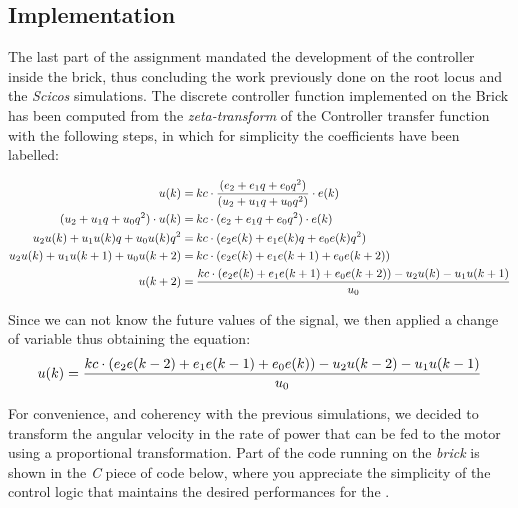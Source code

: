 
\subsection{\LEGOMOTOR{} Implementation}

The last part of the assignment mandated the development of the controller inside the brick, thus concluding the work previously done on the root locus and the \textit{Scicos} simulations. The discrete controller function implemented on the Brick has been computed  from the \textit{zeta-transform} of the Controller transfer function with the following steps, in which for simplicity the coefficients have been labelled:

\[
\begin{split}
u(k) =&\: kc \cdot{}  {(e_2 + e_1q + e_0q^2) \over (u_2 + u_1q + u_0q^2)} \cdot{} e(k)\\
(u_2 + u_1q + u_0q^2)\cdot{}u(k) =&\: kc \cdot{} (e_2 + e_1q + e_0q^2)\cdot{}e(k)\\
u_2u(k) + u_1u(k)q + u_0u(k)q^2 =&\: kc \cdot{} (e_2e(k) + e_1e(k)q + e_0e(k)q^2)\\
u_2u(k) + u_1u(k+1) + u_0u(k+2) =&\: kc \cdot{} (e_2e(k) + e_1e(k+1) + e_0e(k+2))\\
u(k+2) =&\: {kc \cdot{}(e_2e(k) + e_1e(k+1) + e_0e(k+2)) - u_2u(k) - u_1u(k+1) \over{} u_0}
\end{split}
\]

Since we can not know the future values of the signal, we then applied a change of variable thus obtaining the equation:
\[
u(k) = {kc \cdot{}(e_2e(k-2) + e_1e(k-1) + e_0e(k)) - u_2u(k-2) - u_1u(k-1) \over{} u_0}
\]

For convenience, and coherency with the previous simulations, we decided to transform the angular velocity in the rate of power that can be fed to the motor using a proportional transformation. Part of the code running on the \emph{brick} is shown in the  \emph{C} piece of code below, where you appreciate the simplicity of the control logic that maintains the desired performances for the \LEGOMOTOR{}.

